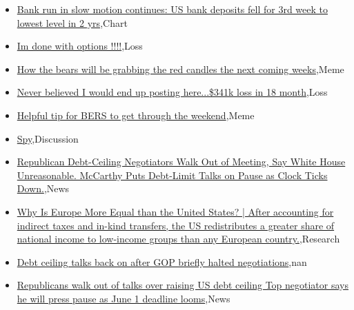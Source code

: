 \documentclass{article}%
\begin{document}
%
\begin{itemize}%
\item%
\href{https://reddit.com/r/wallstreetbets/comments/13mnoc0/bank\_run\_in\_slow\_motion\_continues\_us\_bank/}{Bank run in slow motion continues: US bank deposits fell for 3rd week to lowest level in 2 yrs},Chart%
\item%
\href{https://reddit.com/r/wallstreetbets/comments/13miu2g/im\_done\_with\_options/}{Im done with options !!!!},Loss%
\item%
\href{https://reddit.com/r/wallstreetbets/comments/13mifec/how\_the\_bears\_will\_be\_grabbing\_the\_red\_candles/}{How the bears will be grabbing the red candles the next coming weeks},Meme%
\item%
\href{https://reddit.com/r/wallstreetbets/comments/13mfmrb/never\_believed\_i\_would\_end\_up\_posting\_here341k/}{Never believed I would end up posting here...\$341k loss in 18 month},Loss%
\item%
\href{https://reddit.com/r/wallstreetbets/comments/13mf6pm/helpful\_tip\_for\_bers\_to\_get\_through\_the\_weekend/}{Helpful tip for BERS to get through the weekend},Meme%
\item%
\href{https://reddit.com/r/StockMarket/comments/13md0gp/spy/}{Spy},Discussion%
\item%
\href{https://reddit.com/r/StockMarket/comments/13m56uo/republican\_debtceiling\_negotiators\_walk\_out\_of/}{Republican Debt-Ceiling Negotiators Walk Out of Meeting, Say White House Unreasonable. McCarthy Puts Debt-Limit Talks on Pause as Clock Ticks Down.},News%
\item%
\href{https://reddit.com/r/Economics/comments/13mgdmt/why\_is\_europe\_more\_equal\_than\_the\_united\_states/}{Why Is Europe More Equal than the United States? | After accounting for indirect taxes and in-kind transfers, the US redistributes a greater share of national income to low-income groups than any European country.},Research%
\item%
\href{https://reddit.com/r/Economics/comments/13mcyfm/debt\_ceiling\_talks\_back\_on\_after\_gop\_briefly/}{Debt ceiling talks back on after GOP briefly halted negotiations},nan%
\item%
\href{https://reddit.com/r/Economics/comments/13m4hez/republicans\_walk\_out\_of\_talks\_over\_raising\_us/}{Republicans walk out of talks over raising US debt ceiling  Top negotiator says he will press pause as June 1 deadline looms},News%
\end{itemize}%
\end{document}
